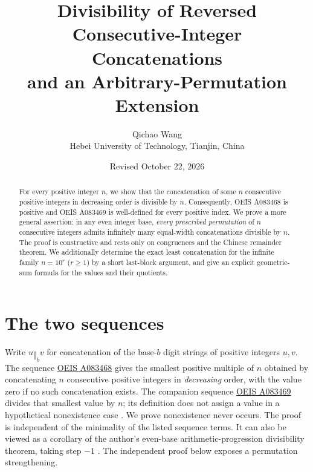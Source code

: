 \documentclass[11pt]{article}
\title{Divisibility of Reversed Consecutive-Integer Concatenations\\and an Arbitrary-Permutation Extension}
\author{Qichao Wang\\\small Hebei University of Technology, Tianjin, China}
\date{Revised October 22, 2026}
\newcommand{\cat}{\mathbin{\Vert}}
\begin{document}
\maketitle
\begin{abstract}
For every positive integer $n$, we show that the concatenation of some
$n$ consecutive positive integers in decreasing order is divisible by $n$.
Consequently, OEIS A083468 is positive and OEIS A083469 is well-defined
for every positive index.  We prove a more general assertion: in any even
integer base, \emph{every prescribed permutation} of $n$ consecutive
integers admits infinitely many equal-width concatenations divisible by
$n$.  The proof is constructive and rests only on congruences and the
Chinese remainder theorem. We additionally determine the exact least
concatenation for the infinite family $n=10^r$ ($r\ge1$) by a short
last-block argument, and give an explicit geometric-sum formula for
the values and their quotients.
\end{abstract}
\section{The two sequences}
Write $u\cat_b v$ for concatenation of the base-$b$ digit strings
of positive integers $u,v$.  The sequence
\href{https://oeis.org/A083468}{OEIS A083468} gives the smallest
positive multiple of $n$ obtained by concatenating $n$ consecutive
positive integers in \emph{decreasing} order, with the value zero
if no such concatenation exists.  The companion sequence
\href{https://oeis.org/A083469}{OEIS A083469} divides that
smallest value by $n$; its definition does not assign a value in a
hypothetical nonexistence case \cite{oeis468,oeis469}.
We prove nonexistence never occurs.  The proof is independent of the
minimality of the listed sequence terms.  It can also be viewed as a
corollary of the author's even-base arithmetic-progression divisibility
theorem, taking step $-1$ \cite{wangAP}.  The independent proof below
exposes a permutation strengthening.
\end{document}
